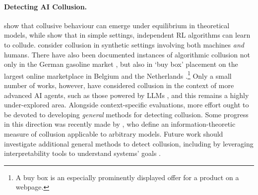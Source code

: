 \paragraph{Detecting AI Collusion.}
\citet{Brown2023,} show that collusive behaviour can emerge under equilibrium in theoretical models, while \citet{Calvano2019,Klein2021Autonomous} show that in simple settings, independent RL algorithms can learn to collude.
\citet{Normann2023,Leisten2021,Werner2021} consider collusion in synthetic settings involving both machines \emph{and} humans.
There have also been documented instances of algorithmic collusion not only in the German gasoline market \citep{Assad2020German}, but also in `buy box' placement on the largest online marketplace in Belgium and the Netherlands \citep{Wieting2021}.\footnote{A buy box is an especially prominently displayed offer for a product on a webpage.}
Only a small number of works, however, have considered collusion in the context of more advanced AI agents, such as those powered by LLMs \citep{motwani2024secret,Fish2024,Mathew2024,OpenAI2023c}, and this remains a highly under-explored area.
Alongside context-specific evaluations, more effort ought to be devoted to developing \textit{general} methods for {detecting collusion}.
Some progress in this direction was recently made by \citet{Bonjour2022}, who define an information-theoretic measure of collusion applicable to arbitrary models.
Future work should investigate additional general methods to detect collusion, including by leveraging interpretability tools to understand systems' goals \citep{Michaud2020,Colognese2023,Mini2023,Marks2023}.

